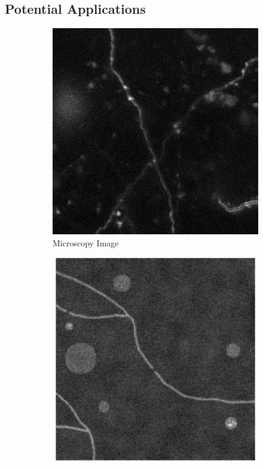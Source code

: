 \subsection{Potential Applications}
\begin{figure}[h]
  \begin{subfigure}[t]{0.24\textwidth}
    \includegraphics[width=\textwidth]{figures/conclusion/real_img.jpg}
    \caption{Microscopy Image}
    \label{subfig:real_img}
  \end{subfigure}\hfill
  \begin{subfigure}[t]{0.24\textwidth}
    \includegraphics[width=\textwidth]{figures/conclusion/synthetic_image_resize.png}

\end{subfigure}
\end{figure}
